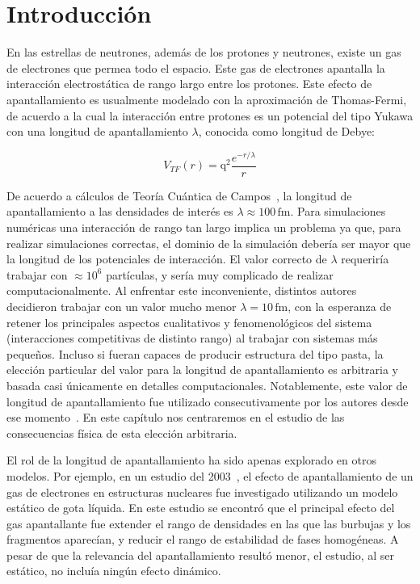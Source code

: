\section{Introducción}

En las estrellas de neutrones, además de los protones y neutrones, existe un gas de electrones que permea todo el espacio.
Este gas de electrones apantalla la interacción electrostática de rango largo entre los protones.
Este efecto de apantallamiento es usualmente modelado con la aproximación de Thomas-Fermi, de acuerdo a la cual la interacción entre protones es un potencial del tipo Yukawa con una longitud de apantallamiento $\lambda$, conocida como longitud de Debye:

\begin{equation*}
 V_{TF}(r) = \text{q}^2\frac{e^{-r/\lambda}}{r}
\end{equation*}

De acuerdo a cálculos de Teoría Cuántica de Campos~\cite[pp. 175-180]{fetter_quantum_2003}, la longitud de apantallamiento a las densidades de interés es $\lambda\approx100\,\text{fm}$. 
Para simulaciones numéricas una interacción de rango tan largo implica un problema ya que, para realizar simulaciones correctas, el dominio de la simulación debería ser mayor que la longitud de los potenciales de interacción.
El valor correcto de $\lambda$ requeriría trabajar con $\approx 10^6$ partículas, y sería muy complicado de realizar computacionalmente.
Al enfrentar este inconveniente, distintos autores~\cite{maruyama_molecular_2012, horowitz_neutrino-pasta_2004} decidieron trabajar con un valor mucho menor $\lambda=10\,\text{fm}$, con la esperanza de retener los principales aspectos cualitativos y fenomenológicos del sistema (interacciones competitivas de distinto rango) al trabajar con sistemas más pequeños.
Incluso si fueran capaces de producir estructura del tipo pasta, la elección particular del valor para la longitud de apantallamiento es arbitraria y basada casi únicamente en detalles computacionales.
Notablemente, este valor de longitud de apantallamiento fue utilizado
consecutivamente por los autores desde ese momento~\cite{maruyama_quantum_1998, horowitz_neutrino-pasta_2004, dorso_topological_2012}.
En este capítulo nos centraremos en el estudio de las consecuencias física de esta elección arbitraria.

El rol de la longitud de apantallamiento ha sido apenas explorado en otros modelos.
Por ejemplo, en un estudio del 2003~\cite{watanabe_electron_2003}, el efecto de apantallamiento de un gas de electrones en estructuras nucleares fue investigado utilizando un modelo estático de gota líquida.
En este estudio se encontró que el principal efecto del gas apantallante fue extender el rango de densidades en las que las burbujas y los fragmentos aparecían, y reducir el rango de estabilidad de fases homogéneas.
A pesar de que la relevancia del apantallamiento resultó menor, el estudio, al ser estático, no incluía ningún efecto dinámico.

